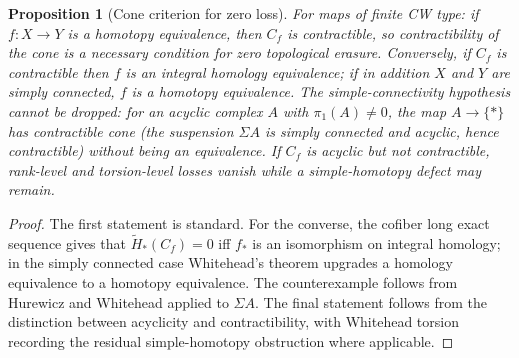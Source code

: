 \documentclass[11pt,a4paper]{article}
\newtheorem{proposition}[theorem]{Proposition}
\theoremstyle{definition}
\theoremstyle{remark}
\begin{document}
\begin{proposition}[Cone criterion for zero loss]
\label{prop:cone-zero}
For maps of finite CW type: if $f:X\to Y$ is a homotopy equivalence, then $C_f$ is
contractible, so contractibility of the cone is a necessary condition for zero topological
erasure.  Conversely, if $C_f$ is contractible then $f$ is an integral homology equivalence;
if in addition $X$ and $Y$ are simply connected, $f$ is a homotopy equivalence.  The
simple-connectivity hypothesis cannot be dropped: for an acyclic complex $A$ with
$\pi_1(A)\neq0$, the map $A\to\{*\}$ has contractible cone (the suspension $\Sigma A$ is
simply connected and acyclic, hence contractible) without being an equivalence.  If
$C_f$ is acyclic but not contractible, rank-level and torsion-level losses vanish while a
simple-homotopy defect may remain.
\end{proposition}

\begin{proof}
The first statement is standard.  For the converse, the cofiber long exact sequence gives that
$\widetilde H_*(C_f)=0$ iff $f_*$ is an isomorphism on integral homology; in the simply
connected case Whitehead's theorem upgrades a homology equivalence to a homotopy equivalence.
The counterexample follows from Hurewicz and Whitehead applied to $\Sigma A$.  The final
statement follows from the distinction between acyclicity and contractibility, with Whitehead
torsion recording the residual simple-homotopy obstruction where applicable.
\end{proof}
\end{document}
